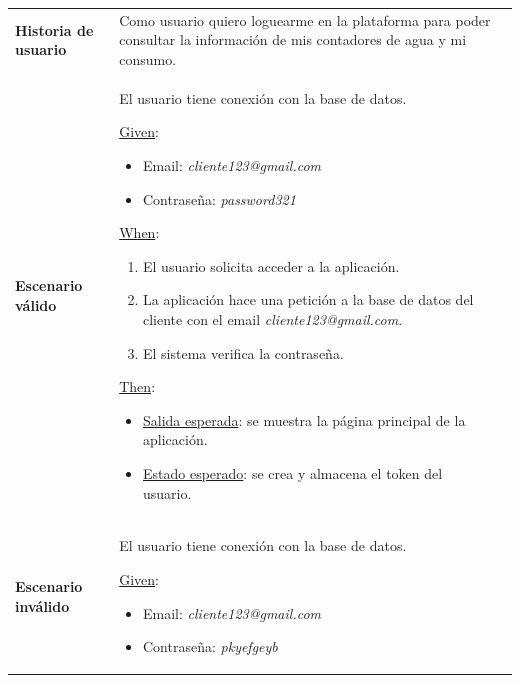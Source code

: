 \documentclass[pdftex,11pt,a4paper]{book}
\begin{document}
\begin{center}
\begin{longtable}{|>{\centering\arraybackslash}X m{2cm}|m{12cm}|}
\hline
\multicolumn{2}{|c|}{\textbf{Prueba de aceptación PA01}}\\
\hline 
\endhead

\textbf{Historia de usuario} & Como usuario quiero loguearme en la plataforma para poder consultar la información de mis contadores de agua y mi consumo.
\\ \hline

\textbf{Escenario válido} & {\raggedright El usuario tiene conexión con la base de datos.\par}
\vspace{2mm}
\break

\underline{Given}:
\begin{itemize}
\addtolength{\itemsep}{-3mm}
\item Email: \textit{cliente123@gmail.com}
\item Contraseña: \textit{password321}
\end{itemize}
\vspace{3mm}

\underline{When}:
\begin{enumerate}
\vspace{-3mm}
\addtolength{\itemsep}{-3mm}
\item El usuario solicita acceder a la aplicación.
\item La aplicación hace una petición a la base de datos del cliente con el email \textit{cliente123@gmail.com}.
\item El sistema verifica la contraseña.
\end{enumerate}
\break

\underline{Then}:
\vspace{-3mm}
\begin{itemize}
\addtolength{\itemsep}{-3mm}
\item \underline{Salida esperada}: se muestra la página principal de la aplicación.
\item \underline{Estado esperado}: se crea y almacena el token del usuario.
\end{itemize}


\\ \hline
\textbf{Escenario inválido} & {\raggedright El usuario tiene conexión con la base de datos.\par}
\vspace{2mm}
\break

\underline{Given}:
\vspace{-3mm}
\begin{itemize}
\addtolength{\itemsep}{-3mm}
\item Email: \textit{cliente123@gmail.com}
\item Contraseña: \textit{pkyefgeyb}
\end{itemize}


\end{longtable}
\end{center}
\end{document}
